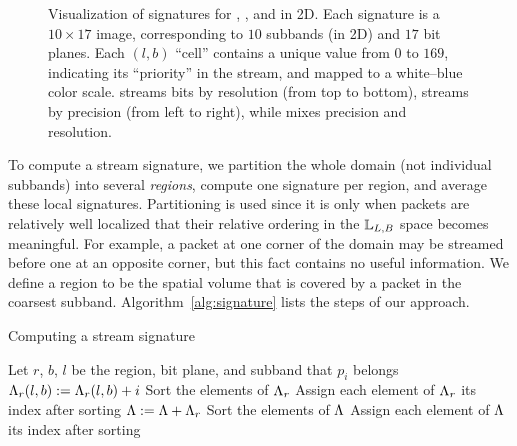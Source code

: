 \begin{figure}[!t]
\centering
\caption{Visualization of signatures for \slvl, \sbit, and \swav in 2D. Each signature is a
$10\times 17$ image, corresponding to $10$ subbands (in 2D) and $17$ bit planes. Each $(l,b)$
``cell'' contains a unique value from $0$ to $169$, indicating its ``priority'' in the stream, and
mapped to a white--blue color scale. \slvl streams bits by resolution (from top to bottom), \sbit
streams by precision (from left to right), while \swav mixes precision and resolution.}
\label{fig:example-signatures}
\vspace{-1em}
\end{figure}

To compute a stream signature, we partition the whole domain (not individual subbands) into several
\emph{regions}, compute one signature per region, and average these local signatures. Partitioning
is used since it is only when packets are relatively well localized that their relative ordering in
the ${\mathbb L}_{L,B}$ space becomes meaningful. For example, a packet at one corner of the domain may
be streamed before one at an opposite corner, but this fact contains no useful information. We
define a region to be the spatial volume that is covered by a packet in the coarsest subband.
Algorithm~\ref{alg:signature} lists the steps of our approach.

\begin{algorithm}[h]
  \caption{Computing a stream signature}
  \begin{algorithmic}[1]
			\State Let $r$, $b$, $l$ be the region, bit plane, and subband that $p_i$ belongs
			\State $\sgn_r(l,b) := \sgn_r(l,b)+i$
		\EndFor
			\State Sort the elements of $\sgn_r$
			\State Assign each element of $\sgn_r$ its index after sorting
			\State $\sgn := \sgn+\sgn_r$
		\EndFor
		\State Sort the elements of $\sgn$
		\State Assign each element of $\sgn$ its index after sorting
	\end{algorithmic}
	\label{alg:signature}
\end{algorithm}

